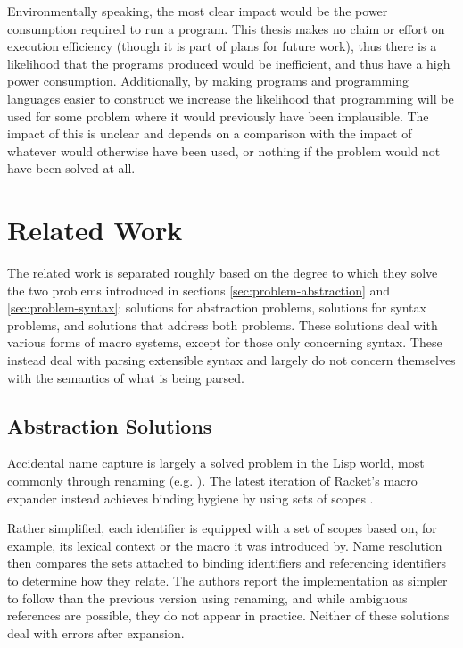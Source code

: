 \documentclass{kththesis}
\begin{document}
Environmentally speaking, the most clear impact would be the power consumption required to run a program. This thesis makes no claim or effort on execution efficiency (though it is part of plans for future work), thus there is a likelihood that the programs produced would be inefficient, and thus have a high power consumption. Additionally, by making programs and programming languages easier to construct we increase the likelihood that programming will be used for some problem where it would previously have been implausible. The impact of this is unclear and depends on a comparison with the impact of whatever would otherwise have been used, or nothing if the problem would not have been solved at all.

\chapter{Related Work}

The related work is separated roughly based on the degree to which they solve the two problems introduced in sections \ref{sec:problem-abstraction} and \ref{sec:problem-syntax}: solutions for abstraction problems, solutions for syntax problems, and solutions that address both problems. These solutions deal with various forms of macro systems, except for those only concerning syntax. These instead deal with parsing extensible syntax and largely do not concern themselves with the semantics of what is being parsed.

\section{Abstraction Solutions} \label{sec:abstraction-solutions}

Accidental name capture is largely a solved problem in the Lisp world, most commonly through renaming (e.g. \cite{FLATT2012Macros-that-Wor}). The latest iteration of Racket's \cite{Flatt2010Reference:-Rack} macro expander instead achieves binding hygiene by using sets of scopes \cite{Flatt2016Binding-As-Sets}.

Rather simplified, each identifier is equipped with a set of scopes based on, for example, its lexical context or the macro it was introduced by. Name resolution then compares the sets attached to binding identifiers and referencing identifiers to determine how they relate. The authors report the implementation as simpler to follow than the previous version using renaming, and while ambiguous references are possible, they do not appear in practice. Neither of these solutions deal with errors after expansion.
\end{document}
